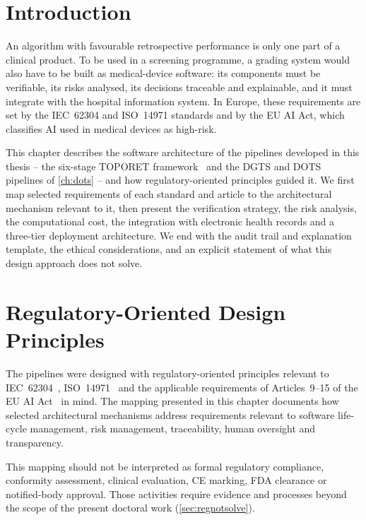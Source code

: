 \section*{Introduction}

An algorithm with favourable retrospective performance is only one part of a clinical
product. To be used in a screening programme, a grading system would also have to be
built as medical-device software: its components must be verifiable, its risks analysed,
its decisions traceable and explainable, and it must integrate with the hospital
information system. In Europe, these requirements are set by the IEC~62304 and ISO~14971
standards and by the EU AI Act, which classifies AI used in medical devices as high-risk.

This chapter describes the software architecture of the pipelines developed in this
thesis -- the six-stage TOPORET framework~\cite{belhadj2026enase} and the DGTS and DOTS
pipelines of \cref{ch:dots} -- and how regulatory-oriented principles guided it. We first
map selected requirements of each standard and article to the architectural mechanism
relevant to it, then present the verification strategy, the risk analysis, the
computational cost, the integration with electronic health records and a three-tier
deployment architecture. We end with the audit trail and explanation template, the
ethical considerations, and an explicit statement of what this design approach does not
solve.

\section{Regulatory-Oriented Design Principles}
\label{sec:regprinciple}

The pipelines were designed with regulatory-oriented principles relevant to
IEC~62304~\cite{iec62304}, ISO~14971~\cite{iso14971} and the applicable requirements of
Articles~9--15 of the EU AI Act~\cite{euaiact2024} in mind. The mapping presented in this
chapter documents how selected architectural mechanisms address requirements relevant to
software life-cycle management, risk management, traceability, human oversight and
transparency.

This mapping should not be interpreted as formal regulatory compliance, conformity
assessment, clinical evaluation, CE marking, FDA clearance or notified-body approval.
Those activities require evidence and processes beyond the scope of the present doctoral
work (\cref{sec:regnotsolve}).

